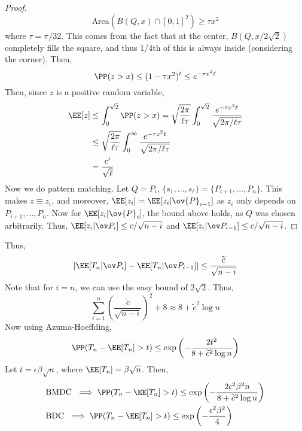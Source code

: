 \begin{eg}
\begin{proof}
\[
\text{Area}(B(Q,x) \cap [0,1]^2) \geq \tau x^2
\]
where $\tau = \pi/32$. This comes from the fact that at the center, $B(Q,x/2\sqrt{2})$ completely fills the square, and thus 1/4th of this is always inside (considering the corner).
Then,
\[
\PP(z > x) \leq (1-\tau x^2) ^ \ell \leq e^{-\tau x^2 \ell}
\]
Then, since $z$ is a positive random variable,
\begin{align*}
    \EE[z] &\leq \int_0^{\sqrt{2}}\PP(z > x) = \sqrt{\frac{2\pi}{\ell \tau}} \int_0^{\sqrt{2}} \frac{e^{-\tau x^2 \ell}}{\sqrt{2\pi / \ell\tau}} \\
    &\leq \sqrt{\frac{2\pi}{\ell \tau}} \int_0^{\infty} \frac{e^{-\tau x^2 \ell}}{\sqrt{2\pi / \ell\tau}} \\
    &= \frac{c'}{\sqrt{\ell}}
\end{align*}
Now we do pattern matching. Let $Q = P_i$, $\{s_1, \dots, s_\ell\} = \{P_{i+1}, \dots, P_n\}$. This makes $z \equiv z_i$, and moreover, $\EE[z_i] = \EE[z_i | \ov{P}_{i-1}]$ as $z_i$ only depends on $P_{i+1}, \dots, P_n$. Now for $\EE[z_i | \ov{P}_i]$, the bound above holds, as $Q$ was chosen arbitrarily. Thus, $\EE[z_i | \ovp_i] \leq c/\sqrt{n-i}$ and $\EE[z_i|\ovp_{i-1}] \leq c/\sqrt{n-i}$. 
\end{proof}
\noindent Thus,
\[
|\EE[T_n | \ovp_i] - \EE[T_n | \ovp_{i-1}]| \leq \frac{\widetilde{c}}{\sqrt{n-i}}
\]
Note that for $i=n$, we can use the easy bound of $2\sqrt{2}$. Thus,
\[
\sum_{i=1}^n \left(\frac{\widetilde{c}}{\sqrt{n-i}}\right)^2 + 8 \approx 8 + \widetilde{c}^2 \log n
\]
Now using Azuma-Hoeffding, 
\[
\PP(T_n - \EE[T_n] > t) \leq \exp\left(-\frac{2t^2}{8 + \widetilde{c}^2 \log n}\right)
\]
Let $t = \epsilon \beta \sqrt{n}$, where $\EE[T_n] = \beta \sqrt{n}$. Then,
\[
\begin{split}
&\text{BMDC }\implies \PP(T_n - \EE[T_n] > t) \leq \exp\left(-\frac{2\epsilon^2\beta^2 n}{8 + \widetilde{c}^2 \log n}\right) \\ 
&\text{BDC }\implies \PP(T_n - \EE[T_n] > t) \leq \exp\left(-\frac{\epsilon^2\beta^2}{4}\right) 
\end{split}
\]
\end{eg}
